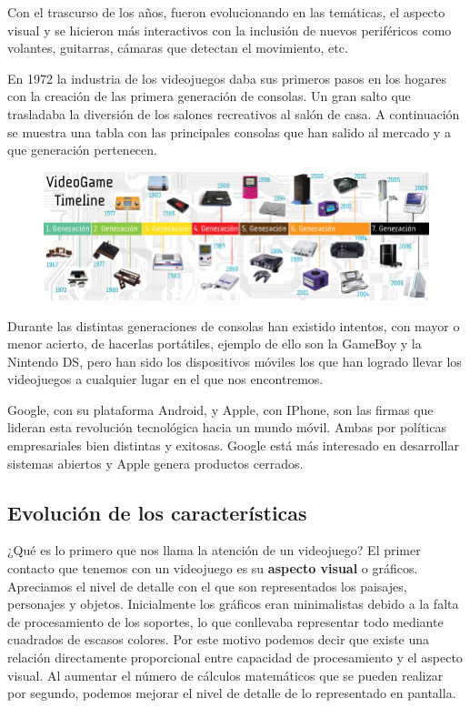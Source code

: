 Con el trascurso de los años, fueron evolucionando en las temáticas, el aspecto visual y se hicieron más interactivos con la inclusión de nuevos periféricos como volantes, guitarras, cámaras que detectan el movimiento, etc. 
\newline 

En 1972 la industria de los videojuegos daba sus primeros pasos en los hogares con la creación de las primera generación de consolas. Un gran salto que  trasladaba la diversión de los salones recreativos al salón de casa. 
\newline
A continuación se muestra una tabla con las principales consolas que han salido al mercado y a que generación pertenecen.

\begin{figure}[h]
	\centering
         \includegraphics[width=14cm]{imagenes/capitulo1/consolas.jpg}
\end{figure}

Durante las distintas generaciones de consolas han existido intentos, con mayor o menor acierto, de hacerlas portátiles, ejemplo de ello son la GameBoy y la Nintendo DS, pero han sido los dispositivos móviles los que han logrado llevar los videojuegos a cualquier lugar en el que nos encontremos.
\newline

Google, con su plataforma Android, y Apple, con IPhone, son las firmas que lideran esta revolución tecnológica hacia un mundo móvil. Ambas por políticas empresariales bien distintas y exitosas. Google está más interesado en desarrollar sistemas abiertos y Apple genera productos cerrados. 

\subsection{Evolución de los características}

¿Qué es lo primero que nos llama la atención de un videojuego? El primer contacto que tenemos con un videojuego es su \textbf{aspecto visual} o gráficos. Apreciamos el nivel de detalle con el que son representados los paisajes, personajes y objetos. Inicialmente los gráficos eran minimalistas debido a la falta de procesamiento de los soportes, lo que conllevaba representar todo mediante cuadrados de escasos colores. Por este motivo podemos decir que existe una relación directamente proporcional entre capacidad de procesamiento y el aspecto visual. Al aumentar el número de cálculos matemáticos que se pueden realizar por segundo, podemos mejorar el nivel de detalle de lo representado en pantalla.
\newline


